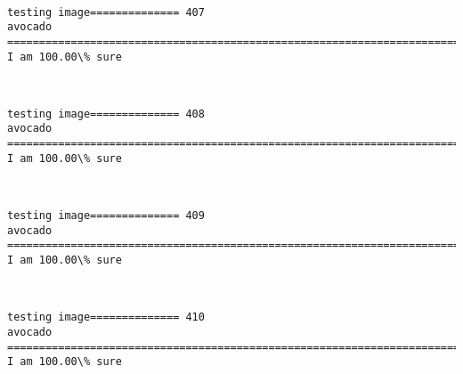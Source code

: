 \documentclass[11pt]{article}
\begin{document}
    \begin{center}
    \end{center}
    { \hspace*{\fill} \\}
    
    \begin{Verbatim}[commandchars=\\\{\}]
testing image============== 407
avocado
============================================================================
I am 100.00\% sure

    \end{Verbatim}

    \begin{center}
    \end{center}
    { \hspace*{\fill} \\}
    
    \begin{Verbatim}[commandchars=\\\{\}]
testing image============== 408
avocado
============================================================================
I am 100.00\% sure

    \end{Verbatim}

    \begin{center}
    \end{center}
    { \hspace*{\fill} \\}
    
    \begin{Verbatim}[commandchars=\\\{\}]
testing image============== 409
avocado
============================================================================
I am 100.00\% sure

    \end{Verbatim}

    \begin{center}
    \end{center}
    { \hspace*{\fill} \\}
    
    \begin{Verbatim}[commandchars=\\\{\}]
testing image============== 410
avocado
============================================================================
I am 100.00\% sure

    \end{Verbatim}
\end{document}
